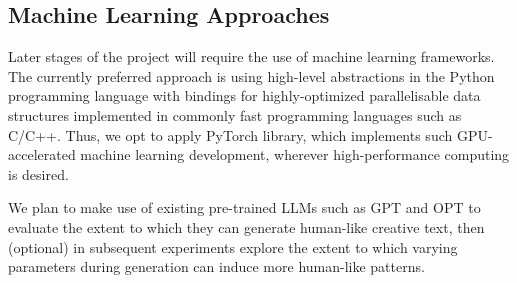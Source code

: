 \documentclass[a4paper,12pt]{article}
\begin{document}
\subsection*{Machine Learning Approaches}
Later stages of the project will require the use of machine learning frameworks. The currently preferred approach is using high-level abstractions in the Python programming language with bindings for highly-optimized parallelisable data structures implemented in commonly fast programming languages such as C/C++. Thus, we opt to apply PyTorch library\cite{NEURIPS2019_9015_pytorch}, which implements such GPU-accelerated machine learning development, wherever high-performance computing is desired. 

We plan to make use of existing pre-trained LLMs such as GPT\cite{brown_gpt3_2020} and OPT\cite{zhang_opt_2022} to evaluate the extent to which they can generate human-like creative text, then (optional) in subsequent experiments explore the extent to which varying parameters during generation can induce more human-like patterns.



\end{document}
